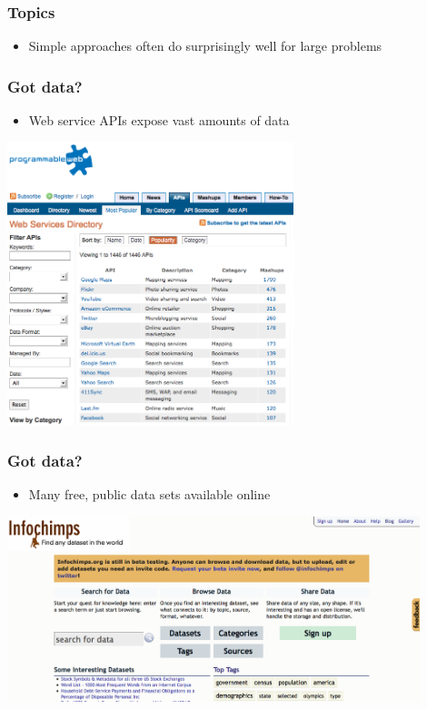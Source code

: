 \documentclass[xcolor=dvipsnames, 9pt]{beamer}
\begin{document}
\begin{frame}
  \frametitle{Topics}

  \begin{itemize}
    \item Simple approaches often do surprisingly well for large problems
  \end{itemize}

\end{frame}

\begin{frame}
  \frametitle{Got data?}

  \begin{itemize}
    \item Web service APIs expose vast amounts of data
  \end{itemize}

    \begin{center}
      \includegraphics[width=0.625\textwidth]{programmableweb.png}
    \end{center}

\end{frame}

\begin{frame}
  \frametitle{Got data?}

  \begin{itemize}
    \item Many free, public data sets available online
  \end{itemize}

    \begin{center}
      \includegraphics[width=0.9\textwidth]{infochimps.png}
    \end{center}

\end{frame}
\end{document}
